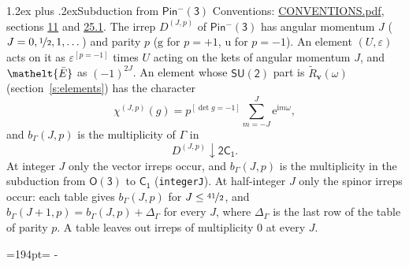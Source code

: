 \documentclass[10pt,a4paper]{article}
\makeatletter
\renewcommand\section{\@startsection{section}{1}{\z@}{-3ex plus -1ex minus -.2ex}%
  {1.2ex plus .2ex}{\normalfont\large\sffamily\bfseries\color{parttitle}}}
\newcommand{\needspace}[1]{\par\penalty-100\begingroup\dimen0=#1\relax\dimen2=\pagegoal
  \advance\dimen2-\pagetotal\ifdim\dimen0>\dimen2\relax\ifdim\dimen2>0pt\vfil\break\fi\fi
  \endgroup}
\numberwithin{equation}{section}
\newcommand{\eltfont}[1]{{\let\sigma\eltsigma\mathelt{#1}}}
\newcommand{\grp}[1]{\mathsf{#1}}
\newcommand{\elt}[1]{\eltfont{#1}}
\newcommand{\ptag}[1]{\mathrm{#1}}
\newcommand{\iverson}[1]{[#1]}
\newcommand{\restr}[2]{#1\!\downarrow#2}
\newcommand{\vv}{\mathbf{v}}
\newcommand{\iunit}{\mathrm{i}}
\newcommand{\expe}{\mathrm{e}}
\newcommand{\irrJp}[2]{D^{(#1,#2)}}
\newcommand{\barred}[1]{\bar{#1}}
\newcommand{\lift}[1]{\tilde{#1}}
\makeatother
\begin{document}
\section{Subduction from \texorpdfstring{$\grp{Pin^{-}(3)}$}{Pin(3)}}\label{s:subduction_parent}
Conventions: \href{../../CONVENTIONS.pdf}{CONVENTIONS.pdf}, sections \href{../../../rotation/CONVENTIONS.pdf\#conv.11}{11} and \href{../../CONVENTIONS.pdf\#conv.25.1}{25.1}.
\leavevmode\label{n:index.J}\label{n:index.parity}\label{n:irrep.o3}The irrep $\irrJp{J}{p}$ of \href{Pinminus3.pdf}{$\grp{Pin^{-}(3)}$} has angular momentum $J$ ($J = 0, \nicefrac{1}{2}, 1, \dots$) and parity $p$ ($\ptag{g}$ for $p = +1$, $\ptag{u}$ for $p = -1$). An element $(U, \varepsilon)$ acts on it as $\varepsilon^{[p = -1]}$ times $U$ acting on the kets of angular momentum $J$, and $\elt{\barred{E}}$ as $(-1)^{2J}$. \label{n:function.character.parent}\label{n:function.multiplicity}An element whose $\grp{SU(2)}$ part is $\lift{R}_{\vv}(\omega)$ (section~\ref{s:elements}) has the character
\begin{equation}\label{e:chi}\chi^{(J,p)}(g) = p^{\iverson{\det g = -1}}\sum_{m=-J}^{J} \expe^{\iunit m\omega},\end{equation}
and $b_\Gamma(J, p)$ is the multiplicity of $\Gamma$ in
\begin{equation}\label{e:parent}\restr{\irrJp{J}{p}}{\grp{2C_{1}}}.\end{equation}
At integer $J$ only the vector irreps occur, and $b_\Gamma(J, p)$ is the multiplicity in the subduction from $\grp{O(3)}$ to \href{../../../rotation/data/pdf/C1.pdf}{$\grp{C_{1}}$} (\texttt{integerJ}). \label{n:index.increment}At half-integer $J$ only the spinor irreps occur: each table gives $b_\Gamma(J, p)$ for $J \le \nicefrac{41}{2}$, and $b_\Gamma(J + 1, p) = b_\Gamma(J, p) + \Delta_\Gamma$ for every $J$, where $\Delta_\Gamma$ is the last row of the table of parity $p$. A table leaves out irreps of multiplicity 0 at every $J$.
\needspace{194pt}
\end{document}
